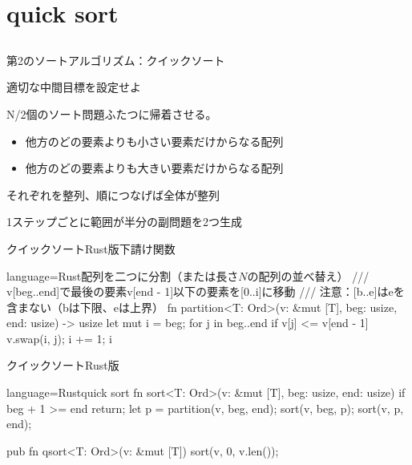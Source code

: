 \documentclass{beamer}
\begin{document}
\section{quick sort}		%
\subsection{}

\begin{frame}[fragile]{第2のソートアルゴリズム：クイックソート}{}

\vfill
適切な中間目標を設定せよ

\vfill
N/2個のソート問題ふたつに帰着させる。

\begin{itemize}%
\item 他方のどの要素よりも小さい要素だけからなる配列
\item 他方のどの要素よりも大きい要素だけからなる配列
\end{itemize}
それぞれを整列、順につなげば全体が整列

\vfill
1ステップごとに範囲が半分の副問題を2つ生成
\end{frame}

\begin{frame}[fragile]{クイックソートRust版下請け関数}{}
\begin{codeof}{language=Rust}{配列を二つに分割（または長さ$N$の配列の並べ替え）}
/// v[beg..end]で最後の要素v[end - 1]以下の要素を[0..i]に移動
/// 注意：[b..e]はeを含まない（bは下限、eは上界）
fn partition<T: Ord>(v: &mut [T], beg: usize, end: usize) -> usize {
    let mut i = beg;
    for j in beg..end {
        if v[j] <= v[end - 1] {
            v.swap(i, j);
            i += 1;
        }
    }
    i
}
\end{codeof}
\end{frame}

\begin{frame}[fragile]{クイックソートRust版}{}
\begin{codeof}{language=Rust}{quick sort}
fn sort<T: Ord>(v: &mut [T], beg: usize, end: usize) {
    if beg + 1 >= end { return; }
    let p = partition(v, beg, end);
    sort(v, beg, p);
    sort(v, p, end);
}

pub fn qsort<T: Ord>(v: &mut [T]) {
    sort(v, 0, v.len());
}
\end{codeof}
\end{frame}
\end{document}
